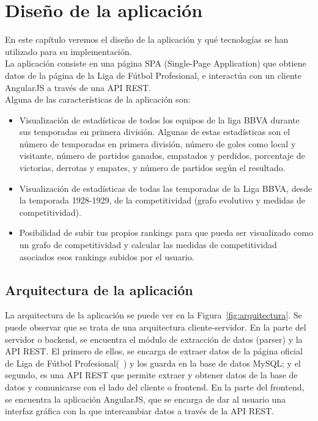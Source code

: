 \chapter{Diseño de la aplicación}

En este capítulo veremos el diseño de la aplicación y qué tecnologías se han utilizado para su implementación.\\

La aplicación consiste en una página SPA (Single-Page Application) que obtiene datos de la página de la Liga de Fútbol Profesional, e interactúa con un cliente AngularJS a través de una API REST.\\

Alguna de las características de la aplicación son:

\begin{itemize}
\item Visualización de estadísticas de todos los equipos de la liga BBVA durante sus temporadas en primera división. Algunas de estas estadísticas son el número de temporadas en primera división, número de goles como local y visitante, número de partidos ganados, empatados y perdidos, porcentaje de victorias, derrotas y empates, y número de partidos según el resultado.

\item Visualización de estadísticas de todas las temporadas de la Liga BBVA, desde la temporada 1928-1929, de la competitividad (grafo evolutivo y medidas de competitividad).

\item Posibilidad de subir tus propios rankings para que pueda ser visualizado como un grafo de competitividad y calcular las medidas de competitividad asociados esos rankings subidos por el usuario.
\end{itemize}

\section{Arquitectura de la aplicación}

La arquitectura de la aplicación se puede ver en la Figura~\ref{fig:arquitectura}. Se puede observar que se trata de una arquitectura cliente-servidor. En la parte del servidor o backend, se encuentra el módulo de extracción de datos (parser) y la API REST. El primero de ellos, se encarga de extraer datos de la página oficial de Liga de Fútbol Profesional(~\cite{lfp}) y los guarda en la base de datos MySQL; y el segundo, es una API REST que permite extraer y obtener datos de la base de datos y comunicarse con el lado del cliente o frontend. En la parte del frontend, se encuentra la aplicación AngularJS, que se encarga de dar al usuario una interfaz gráfica con la que intercambiar datos a través de la API REST.

